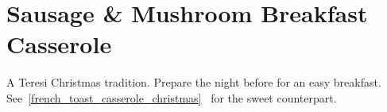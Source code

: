 \section[Sausage Casserole]{
    Sausage \& Mushroom Breakfast Casserole
}\label{sausage_casserole_christmas}

\begin{recipestats}[
        servings=8,
        preptime=1 \hour,
        bakingtime=1 \hour,
        inactivetime=12 \hour,
        source=Mike \& Jane,
        original=Pam Teresi \& Southern Living '86,
    ]
\end{recipestats}

\begin{recipeabstract}
    A Teresi Christmas tradition.
    Prepare the night before for an easy breakfast.
    See~\ref{french_toast_casserole_christmas}~
    for the sweet counterpart.
\end{recipeabstract}

\begin{ingredientcolumns}[1]
    \begin{ingredientblock}
        \\
        \\
        \\
        \\
        \\
        \\
        \\
        \\
    \end{ingredientblock}
\end{ingredientcolumns}

